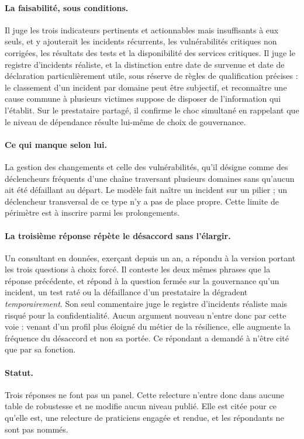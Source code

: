 \paragraph{La faisabilité, sous conditions.} Il juge les trois indicateurs pertinents et
actionnables mais insuffisants à eux seuls, et y ajouterait les incidents récurrents, les
vulnérabilités critiques non corrigées, les résultats des tests et la disponibilité des services
critiques. Il juge le registre d'incidents réaliste, et la distinction entre date de survenue et
date de déclaration particulièrement utile, sous réserve de règles de qualification précises :
le classement d'un incident par domaine peut être subjectif, et reconnaître une cause commune à
plusieurs victimes suppose de disposer de l'information qui l'établit. Sur le prestataire
partagé, il confirme le choc simultané en rappelant que le niveau de dépendance résulte lui-même
de choix de gouvernance.

\paragraph{Ce qui manque selon lui.} La gestion des changements et celle des vulnérabilités,
qu'il désigne comme des déclencheurs fréquents d'une chaîne traversant plusieurs domaines sans
qu'aucun ait été défaillant au départ. Le modèle fait naître un incident sur un pilier ; un
déclencheur transversal de ce type n'y a pas de place propre. Cette limite de périmètre est à
inscrire parmi les prolongements.

\paragraph{La troisième réponse répète le désaccord sans l'élargir.} Un consultant en données,
exerçant depuis un an, a répondu à la version portant les trois questions à choix forcé. Il
conteste les deux mêmes phrases que la réponse précédente, et répond à la question fermée sur la
gouvernance qu'un incident, un test raté ou la défaillance d'un prestataire la dégradent
\emph{temporairement}. Son seul commentaire juge le registre d'incidents réaliste mais risqué pour
la confidentialité. Aucun argument nouveau n'entre donc par cette voie : venant d'un profil plus
éloigné du métier de la résilience, elle augmente la fréquence du désaccord et non sa portée. Ce
répondant a demandé à n'être cité que par sa fonction.

\paragraph{Statut.} Trois réponses ne font pas un panel. Cette relecture n'entre donc dans aucune
table de robustesse et ne modifie aucun niveau publié. Elle est citée pour ce qu'elle est, une
relecture de praticiens engagée et rendue, et les répondants ne sont pas nommés.

